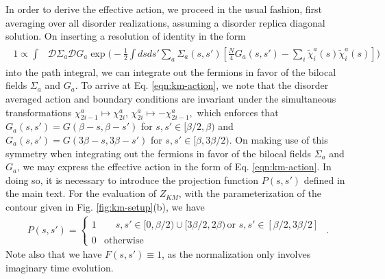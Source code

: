 \documentclass[reprint, floatfix,eqsecnum,superscriptaddress,preprint,nofootinbib,onecolumn,amsmath,amssymb,aps,prb]{revtex4-2}
\newcommand{\tchi}{\tilde{\chi}}
\begin{document}
In order to derive the effective action, we proceed in the usual fashion, first averaging over all disorder realizations, assuming a disorder replica diagonal solution. On inserting a resolution of identity in the form
\begin{align}
    \begin{split}
    1 \propto  \int & \mathcal{D}\Sigma_a \mathcal{D}G_a  \exp \Bigg( - \frac{1}{2} \int ds ds' \sum_a \Sigma_a(s,s') \left[ \frac{N}{4} G_a(s,s') - \sum_i \tchi_i^a(s) \tchi_i^a(s) \right] \Bigg) 
    \end{split} %
\end{align}
into the path integral, we can integrate out the fermions in favor of the bilocal fields $\Sigma_a$ and $G_a$. 
To arrive at Eq. \eqref{eqn:km-action}, we note that the disorder averaged action and boundary conditions are invariant under the simultaneous transformations
    $\chi_{2i-1}^a \mapsto \chi_{2i}^a, \, \chi_{2i}^a \mapsto - \chi_{2i-1}^a,$
which enforces that $G_a(s,s') = G(\beta - s, \beta - s')$ for $s,s' \in [\beta/2,\beta)$ and $G_a(s,s') = G(3\beta - s, 3\beta - s')$ for $s,s' \in [\beta,3\beta / 2)$.
On making use of this symmetry when integrating out the fermions in favor of the bilocal fields $\Sigma_a$ and $G_a$, we may express the effective action in the form of Eq. \eqref{eqn:km-action}. In doing so, it is necessary to introduce the projection function $P(s,s')$ defined in the main text. For the evaluation of $Z_{KM}$, with the parameterization of the contour given in Fig. \ref{fig:km-setup}(b), we have
\begin{align}
    P(s,s') = \begin{cases}
        1  & \!\begin{aligned} &s,s' \in [0,\beta/2) \cup [3\beta/2,2\beta) \, \text{or } s,s' \in [\beta/2,3\beta/2] 
            \!\end{aligned} \\
        0  & \text{otherwise}
    \end{cases} .
\end{align}
Note also that we have $F(s,s') \equiv 1$, as the normalization only involves imaginary time evolution.
\end{document}
